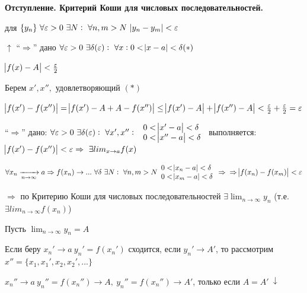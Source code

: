 \documentclass{article}
\begin{document}
\begin{enumerate}
      \textbf{Отступление. Критерий Коши для числовых последовательностей.}
      
      для \(\{y_n\}\ \forall \varepsilon > 0\ \exists N:\ \forall n, m > N\ \abs{y_n - y_m} < \varepsilon\)
  
      \( \uparrow \) ``\(\Rightarrow\)'' дано \( \forall \varepsilon > 0\ \exists \delta(\varepsilon):\ \forall x: 0 < \abs{x - a} < \delta (*)\)

      \( \abs{f(x) - A} < \frac{\varepsilon}{2} \)
      
      Берем \( x',x'',\) удовлетворяющий $(*)$

      \( \abs{f(x') - f(x'')} = \abs{f(x') - A + A - f(x'')} \leq \abs{f(x') - A} + \abs{f(x'') - A} < \frac{\varepsilon}{2} + \frac{\varepsilon}{2} = \varepsilon \)

      ``\(\Rightarrow\)'' дано: \(\forall \varepsilon > 0\ \exists \delta(\varepsilon):\ \forall x',x'':\ \begin{array}{l}0 < \abs{x' - a} < \delta\\ 0 < \abs{x'' - a} < \delta\end{array}\) выполняется:\\
      \(\abs{f(x')-f(x'')} < \varepsilon \Rightarrow\ \exists lim_{x \rightarrow a} f(x)\)

      \(\forall x_n \xrightarrow[n \rightarrow \infty]{} a \Rightarrow f(x_n) \rightarrow ...\ \forall \delta\ \exists N:\ \forall n,m > N \begin{array}{l}0 < \abs{x_n - a} < \delta\\ 0 < \abs{x_m - a} < \delta \end{array} \Rightarrow\\
      \Rightarrow \abs{f(x_n)-f(x_m)}< \varepsilon\)
      
      \(\Rightarrow\) по Критерию Коши для числовых последовательностей \(\exists \lim_{n \rightarrow \infty} y_n\) (т.е. \(\exists lim_{n \rightarrow \infty} f(x_n)\))
            
      Пусть \( \lim_{n \rightarrow \infty} y_n = A \)

      Если беру \( x_n' \rightarrow a\ y_n' = f(x_n')\) сходится, если \( y_n' \rightarrow A' \), то рассмотрим \(x'' = \{x_1, x_1', x_2, x_2', ...\} \)

      \( x_n'' \rightarrow a\ y_n'' = f(x_n'') \rightarrow A,\ y_n'' = f(x_n'') \rightarrow A'\), только если \( A = A'\ \downarrow \)

  \end{enumerate}
\end{document}
